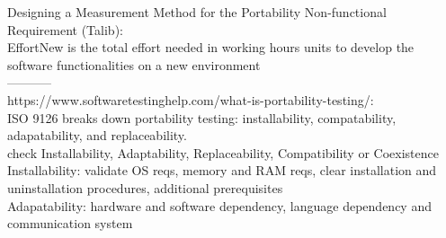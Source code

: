 \documentclass{article}
\begin{document}
Designing a Measurement Method for the Portability Non-functional Requirement (Talib):\\
 EffortNew is the total effort needed in working hours units
 to develop the software functionalities on a new
 environment\\
 
 
-----------\\
https://www.softwaretestinghelp.com/what-is-portability-testing/:\\

ISO 9126 breaks down portability testing: installability, compatability, adapatability, and replaceability.\\ 

check Installability, Adaptability, Replaceability, Compatibility or Coexistence\\

Installability: validate OS reqs, memory and RAM reqs, clear installation and uninstallation procedures, additional prerequisites\\

Adapatability: hardware and software dependency, language dependency and communication system\\
\end{document}
